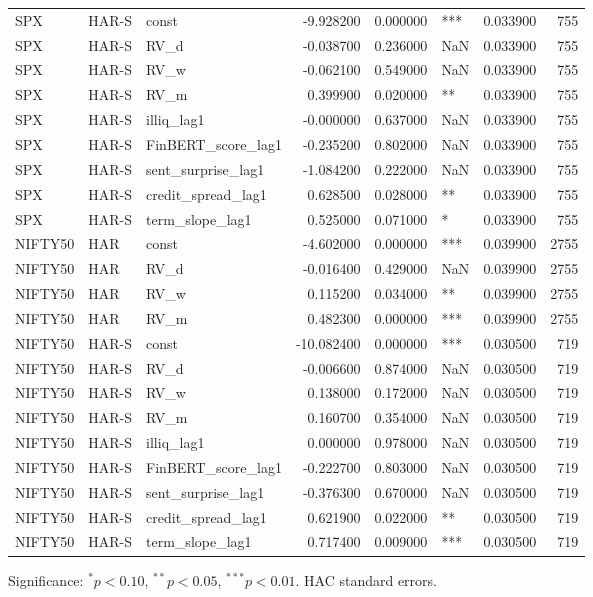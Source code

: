 \begin{table}[htbp]
{\begin{tabular}{lllrrlrr}
SPX & HAR-S & const & -9.928200 & 0.000000 & *** & 0.033900 & 755 \\
SPX & HAR-S & RV\_d & -0.038700 & 0.236000 & NaN & 0.033900 & 755 \\
SPX & HAR-S & RV\_w & -0.062100 & 0.549000 & NaN & 0.033900 & 755 \\
SPX & HAR-S & RV\_m & 0.399900 & 0.020000 & ** & 0.033900 & 755 \\
SPX & HAR-S & illiq\_lag1 & -0.000000 & 0.637000 & NaN & 0.033900 & 755 \\
SPX & HAR-S & FinBERT\_score\_lag1 & -0.235200 & 0.802000 & NaN & 0.033900 & 755 \\
SPX & HAR-S & sent\_surprise\_lag1 & -1.084200 & 0.222000 & NaN & 0.033900 & 755 \\
SPX & HAR-S & credit\_spread\_lag1 & 0.628500 & 0.028000 & ** & 0.033900 & 755 \\
SPX & HAR-S & term\_slope\_lag1 & 0.525000 & 0.071000 & * & 0.033900 & 755 \\
NIFTY50 & HAR & const & -4.602000 & 0.000000 & *** & 0.039900 & 2755 \\
NIFTY50 & HAR & RV\_d & -0.016400 & 0.429000 & NaN & 0.039900 & 2755 \\
NIFTY50 & HAR & RV\_w & 0.115200 & 0.034000 & ** & 0.039900 & 2755 \\
NIFTY50 & HAR & RV\_m & 0.482300 & 0.000000 & *** & 0.039900 & 2755 \\
NIFTY50 & HAR-S & const & -10.082400 & 0.000000 & *** & 0.030500 & 719 \\
NIFTY50 & HAR-S & RV\_d & -0.006600 & 0.874000 & NaN & 0.030500 & 719 \\
NIFTY50 & HAR-S & RV\_w & 0.138000 & 0.172000 & NaN & 0.030500 & 719 \\
NIFTY50 & HAR-S & RV\_m & 0.160700 & 0.354000 & NaN & 0.030500 & 719 \\
NIFTY50 & HAR-S & illiq\_lag1 & 0.000000 & 0.978000 & NaN & 0.030500 & 719 \\
NIFTY50 & HAR-S & FinBERT\_score\_lag1 & -0.222700 & 0.803000 & NaN & 0.030500 & 719 \\
NIFTY50 & HAR-S & sent\_surprise\_lag1 & -0.376300 & 0.670000 & NaN & 0.030500 & 719 \\
NIFTY50 & HAR-S & credit\_spread\_lag1 & 0.621900 & 0.022000 & ** & 0.030500 & 719 \\
NIFTY50 & HAR-S & term\_slope\_lag1 & 0.717400 & 0.009000 & *** & 0.030500 & 719 \\
\bottomrule
\end{tabular}
}
\begin{tablenotes}\footnotesize
  \item Significance: $^{*}p<0.10$, $^{**}p<0.05$, $^{***}p<0.01$. HAC standard errors.
\end{tablenotes}
\end{table}
